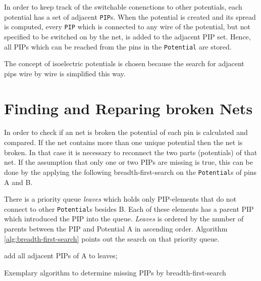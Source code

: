 In order to keep track of the switchable conenctions to other potentials, each potential has a set of adjacent \texttt{PIP}s. When the potential is created and its spread is computed, every \texttt{PIP} which is connected to any wire of the potential, but not specified to be switched on by the net, is added to the adjacent PIP set. Hence, all PIPs which can be reached from the pins in the \texttt{Potential} are stored.

The concept of isoelectric potentials is chosen because the search for adjacent pips wire by wire is simplified this way.


\newpage
\section{Finding and Reparing broken Nets}
\label{sec:findingandrepairingbrokennets}

In order to check if an net is broken the potential of each pin is calculated and compared. If the net contains more than one unique potential then the net is broken.
In that case it is necessary to reconnect the two parts (potentials) of that net. If the assumption that only one or two PIPs are missing is true, this can be done by the applying the following breadth-first-search on the \texttt{Potential}s of pins A and B.

There is a priority queue \textit{leaves} which holds only PIP-elements that do not connect to other \texttt{Potential}s besides B. 
Each of these elements has a parent PIP which introduced the PIP into the queue. \textit{Leaves} is ordered by the number of parents between the PIP and Potential A in ascending order. Algorithm \ref{alg:breadth-first-search} points out the search on that priority queue.

\begin{algorithm}[H]
	add all adjacent PIPs of A to leaves;\\
 \caption{Exemplary algorithm to determine missing PIPs by breadth-first-search}
 \label{alg:breadth-first-search}
\end{algorithm}


